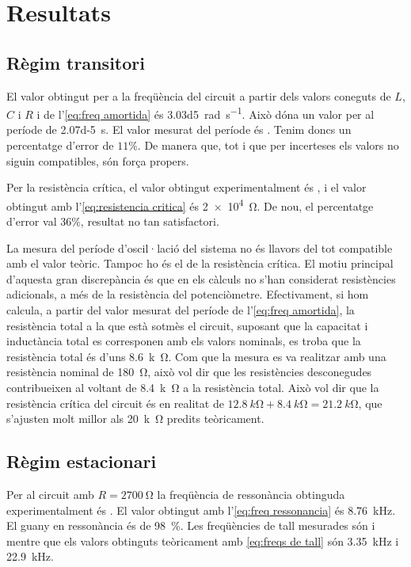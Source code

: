 \section{Resultats}
\subsection{Règim transitori}
El valor obtingut per a la freqüència del circuit a partir dels valors coneguts de \( L \), \( C \) i \( R \) i de l'\cref{eq:freq amortida} és \SI{3.03d5}{rad.s^{-1}}. Això dóna un valor per al període de \SI{2.07d-5}{s}. El valor mesurat del període és . Tenim doncs un percentatge d'error de $11\%$. De manera que, tot i que per incerteses els valors no siguin compatibles, són força propers.

Per la resistència crítica, el valor obtingut experimentalment és , i el valor obtingut amb l'\cref{eq:resistencia critica} és \SI{2e4}{\ohm}. De nou, el percentatge d'error val $36\%$, resultat no tan satisfactori. 

La mesura del període d'oscil·lació del sistema no és llavors del tot compatible amb el valor teòric. Tampoc ho és el de la resistència crítica. El motiu principal d'aquesta gran discrepància és que en els càlculs no s'han considerat resistències adicionals, a més de la resistència del potenciòmetre. Efectivament, si hom calcula, a partir del valor mesurat del període de l'\cref{eq:freq amortida}, la resistència total a la que està sotmès el circuit, suposant que la capacitat i inductància total es corresponen amb els valors nominals, es troba que la resistència total és d'uns \SI{8.6}{k\ohm}. Com que la mesura es va realitzar amb una resistència nominal de \SI{180}{\ohm}, això vol dir que les resistències desconegudes contribueixen al voltant de \SI{8.4}{k\ohm} a la resistència total. Això vol dir que la resistència crítica del circuit és en realitat de \( \SI{12.8}{k\ohm} + \SI{8.4}{k\ohm} = \SI{21.2}{k\ohm} \), que s'ajusten molt millor als \SI{20}{k\ohm} predits teòricament.  

\subsection{Règim estacionari}
Per al circuit amb \( R = \SI{2700}{\ohm} \) la freqüència de ressonància obtinguda experimentalment és . El valor obtingut amb l'\cref{eq:freq ressonancia} és \SI{8.76}{kHz}. El guany en ressonància és de \SI{98}{\percent}. Les freqüències de tall mesurades són  i  mentre que els valors obtinguts teòricament amb \cref{eq:freqs de tall} són \SI{3.35}{kHz} i \SI{22.9}{kHz}.

